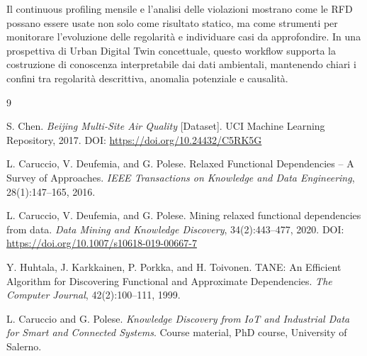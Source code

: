 \documentclass[a4paper,12pt]{article}
\begin{document}
Il continuous profiling mensile e l'analisi delle violazioni mostrano come le RFD possano essere usate non solo come risultato statico, ma come strumenti per monitorare l'evoluzione delle regolarità e individuare casi da approfondire. In una prospettiva di Urban Digital Twin concettuale, questo workflow supporta la costruzione di conoscenza interpretabile dai dati ambientali, mantenendo chiari i confini tra regolarità descrittiva, anomalia potenziale e causalità.

\begin{thebibliography}{9}

S. Chen.
\newblock \textit{Beijing Multi-Site Air Quality} [Dataset].
\newblock UCI Machine Learning Repository, 2017.
\newblock DOI: \url{https://doi.org/10.24432/C5RK5G}

L. Caruccio, V. Deufemia, and G. Polese.
\newblock Relaxed Functional Dependencies -- A Survey of Approaches.
\newblock \textit{IEEE Transactions on Knowledge and Data Engineering}, 28(1):147--165, 2016.

L. Caruccio, V. Deufemia, and G. Polese.
\newblock Mining relaxed functional dependencies from data.
\newblock \textit{Data Mining and Knowledge Discovery}, 34(2):443--477, 2020.
\newblock DOI: \url{https://doi.org/10.1007/s10618-019-00667-7}

Y. Huhtala, J. Karkkainen, P. Porkka, and H. Toivonen.
\newblock TANE: An Efficient Algorithm for Discovering Functional and Approximate Dependencies.
\newblock \textit{The Computer Journal}, 42(2):100--111, 1999.

L. Caruccio and G. Polese.
\newblock \textit{Knowledge Discovery from IoT and Industrial Data for Smart and Connected Systems}.
\newblock Course material, PhD course, University of Salerno.

\end{thebibliography}
\end{document}
